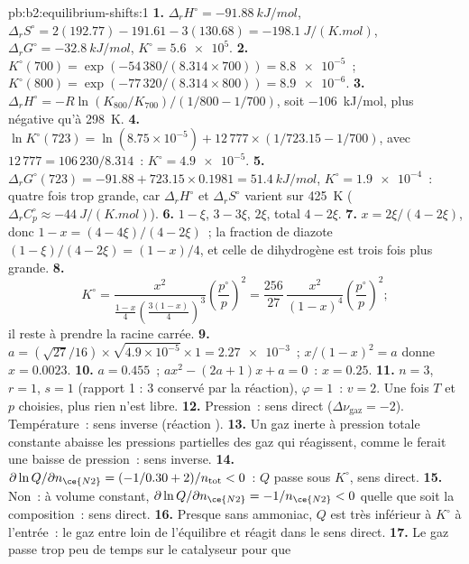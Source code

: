 \begin{solution}{pb:b2:equilibrium-shifts:1}
\textbf{1.} $\Delta_r H^\circ = \qty{-91.88}{kJ/mol}$, $\Delta_r S^\circ =
2(192.77) - 191.61 - 3(130.68) = \qty{-198.1}{J/(K.mol)}$, $\Delta_r G^\circ =
\qty{-32.8}{kJ/mol}$, $K^\circ = \num{5.6e5}$.
\textbf{2.} $K^\circ(700) = \exp(-54\,380/(8.314 \times 700)) = \num{8.8e-5}$~;
$K^\circ(800) = \exp(-77\,320/(8.314 \times 800)) = \num{8.9e-6}$.
\textbf{3.} $\Delta_r H^\circ = -R\ln(K_{800}/K_{700})/(1/800 - 1/700)$,
soit \qty{-106}{kJ/mol}, plus négative qu'à \qty{298}{K}.
\textbf{4.} $\ln K^\circ(723) = \ln(8.75 \times 10^{-5}) + 12\,777 \times
(1/723.15 - 1/700)$, avec $12\,777 = 106\,230/8.314$~: $K^\circ =
\num{4.9e-5}$.
\textbf{5.} $\Delta_r G^\circ(723) = -91.88 + 723.15 \times 0.1981 =
\qty{51.4}{kJ/mol}$, $K^\circ = \num{1.9e-4}$~: quatre fois trop grande, car
$\Delta_r H^\circ$ et $\Delta_r S^\circ$ varient sur \qty{425}{K}
($\Delta_r C_p^\circ \approx \qty{-44}{J/(K.mol)}$).
\textbf{6.}  $1 - \xi$,  $3 - 3\xi$,  $2\xi$, total $4 -
2\xi$.
\textbf{7.} $x = 2\xi/(4 - 2\xi)$, donc $1 - x = (4 - 4\xi)/(4 - 2\xi)$~; la
fraction de diazote $(1 - \xi)/(4 - 2\xi) = (1 - x)/4$, et celle de dihydrogène
est trois fois plus grande.
\textbf{8.}
\[
  K^\circ = \frac{x^2}{\frac{1-x}{4}\left(\frac{3(1-x)}{4}\right)^3}
  \left(\frac{p^\circ}{p}\right)^2 = \frac{256}{27}\,\frac{x^2}{(1 - x)^4}
  \left(\frac{p^\circ}{p}\right)^2 ;
\]
il reste à prendre la racine carrée.
\textbf{9.} $a = (\sqrt{27}/16) \times \sqrt{4.9 \times 10^{-5}} \times 1 =
\num{2.27e-3}$~; $x/(1 - x)^2 = a$ donne $x = 0.0023$.
\textbf{10.} $a = 0.455$~; $ax^2 - (2a + 1)x + a = 0$~: $x = 0.25$.
\textbf{11.} $n = 3$, $r = 1$, $s = 1$ (rapport 1 : 3 conservé par la réaction),
$\varphi = 1$~: $v = 2$. Une fois $T$ et $p$ choisies, plus rien n'est libre.
\textbf{12.} Pression~: sens direct ($\Delta\nu_{\text{gaz}} = -2$). Température~:
sens inverse (réaction ).
\textbf{13.} Un gaz inerte à pression totale constante abaisse les pressions
partielles des gaz qui réagissent, comme le ferait une baisse de pression~: sens inverse.
\textbf{14.} $\partial\ln Q/\partial n_{\ce{N2}} = (-1/0.30 + 2)/n_{\text{tot}} < 0$~:
$Q$ passe sous $K^\circ$, sens direct.
\textbf{15.} Non~: à volume constant, $\partial\ln Q/\partial n_{\ce{N2}} =
-1/n_{\ce{N2}} < 0$ quelle que soit la composition~: sens direct.
\textbf{16.} Presque sans ammoniac, $Q$ est très inférieur à $K^\circ$ à l'entrée~:
le gaz entre loin de l'équilibre et réagit dans le sens direct.
\textbf{17.} Le gaz passe trop peu de temps sur le catalyseur pour que

\end{solution}
